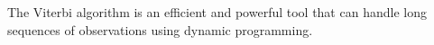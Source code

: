 The Viterbi algorithm is an efficient and powerful tool that can handle long sequences of observations using dynamic programming.






